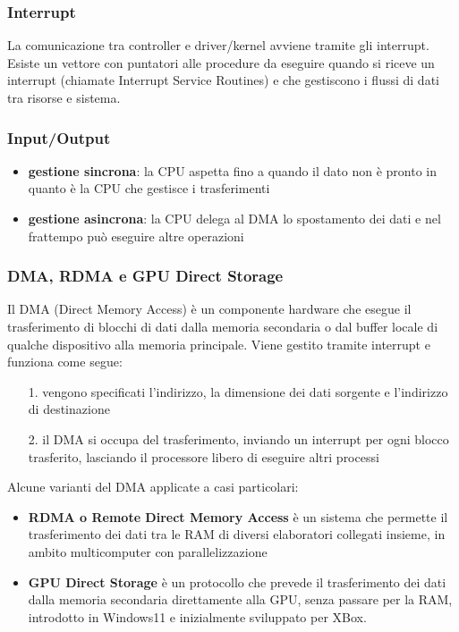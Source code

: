 \documentclass[a4paper]{article}
\begin{document}
\subsubsection*{Interrupt}
La comunicazione tra controller e driver/kernel avviene tramite gli interrupt. Esiste un vettore con puntatori alle procedure da
eseguire quando si riceve un interrupt (chiamate Interrupt Service Routines) e che gestiscono i flussi di dati tra risorse e sistema.

\subsubsection*{Input/Output}
\begin{itemize}
	\item \textbf{gestione sincrona}: la CPU aspetta fino a quando il dato non è pronto in quanto è la CPU che gestisce i trasferimenti
	\item \textbf{gestione asincrona}: la CPU delega al DMA lo spostamento dei dati e nel frattempo può eseguire altre operazioni
\end{itemize}

\subsubsection*{DMA, RDMA e GPU Direct Storage}
Il DMA (Direct Memory Access) è un componente hardware che esegue il trasferimento di blocchi di dati dalla memoria secondaria o
dal buffer locale di qualche dispositivo alla memoria principale. Viene gestito tramite interrupt e funziona come segue:
\begin{itemize}
	\item[1.] vengono specificati l'indirizzo, la dimensione dei dati sorgente e l'indirizzo di destinazione
	\item[2.] il DMA si occupa del trasferimento, inviando un interrupt per ogni blocco trasferito, lasciando il processore
	libero di eseguire altri processi
\end{itemize}
Alcune varianti del DMA applicate a casi particolari:
\begin{itemize}
	\item \textbf{RDMA o Remote Direct Memory Access} è un sistema che permette il trasferimento dei dati tra le RAM di diversi elaboratori
	collegati insieme, in ambito multicomputer con parallelizzazione
	\item \textbf{GPU Direct Storage} è un protocollo che prevede il trasferimento dei dati dalla memoria secondaria direttamente alla GPU,
	senza passare per la RAM, introdotto in Windows11 e inizialmente sviluppato per XBox.
\end{itemize}
\end{document}
